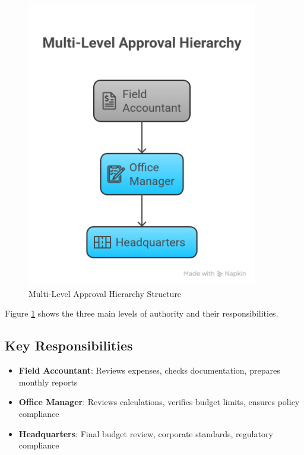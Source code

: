 \begin{figure}[H]
    \centering
    \includegraphics[width=0.9\textwidth]{assets/images/approval_hierarchy.png}
    \caption{Multi-Level Approval Hierarchy Structure}
    \label{fig:approval_hierarchy}
\end{figure}

Figure \ref{fig:approval_hierarchy} shows the three main levels of authority and their responsibilities.

\subsection{Key Responsibilities}
\begin{itemize}[leftmargin=*, itemsep=0.25em]
    \item \textbf{Field Accountant}: Reviews expenses, checks documentation, prepares monthly reports
    \item \textbf{Office Manager}: Reviews calculations, verifies budget limits, ensures policy compliance
    \item \textbf{Headquarters}: Final budget review, corporate standards, regulatory compliance
\end{itemize}


